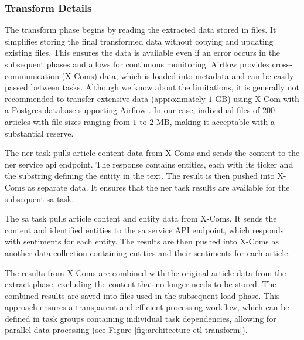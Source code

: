\subsubsection{Transform Details}
\label{subsubsec:architecture-etl-transform-details}
The transform phase begins by reading the extracted data stored in files. It simplifies storing the final transformed data without copying and updating existing files. This ensures the data is available even if an error occurs in the subsequent phases and allows for continuous monitoring. Airflow provides cross-communication (X-Coms) data, which is loaded into metadata and can be easily passed between tasks. Although we know about the limitations, it is generally not recommended to transfer extensive data (approximately $1$ GB) using X-Com with a Postgres database supporting Airflow \parencite{laura2023-medium}. In our case, individual files of $200$ articles with file sizes ranging from $1$ to $2$ MB, making it acceptable with a substantial reserve.

The \acrshort{ner} task pulls article content data from X-Coms and sends the content to the \acrshort{ner} service \acrshort{api} endpoint. The response contains entities, each with its ticker and the substring defining the entity in the text. The result is then pushed into X-Coms as separate data. It ensures that the \acrshort{ner} task results are available for the subsequent \acrshort{sa} task.

The \acrshort{sa} task pulls article content and entity data from X-Coms. It sends the content and identified entities to the \acrshort{sa} service API endpoint, which responds with sentiments for each entity. The results are then pushed into X-Coms as another data collection containing entities and their sentiments for each article.

The results from X-Coms are combined with the original article data from the extract phase, excluding the content that no longer needs to be stored. The combined results are saved into files used in the subsequent load phase. This approach ensures a transparent and efficient processing workflow, which can be defined in task groups containing individual task dependencies, allowing for parallel data processing (see Figure \ref{fig:architecture-etl-transform}).

